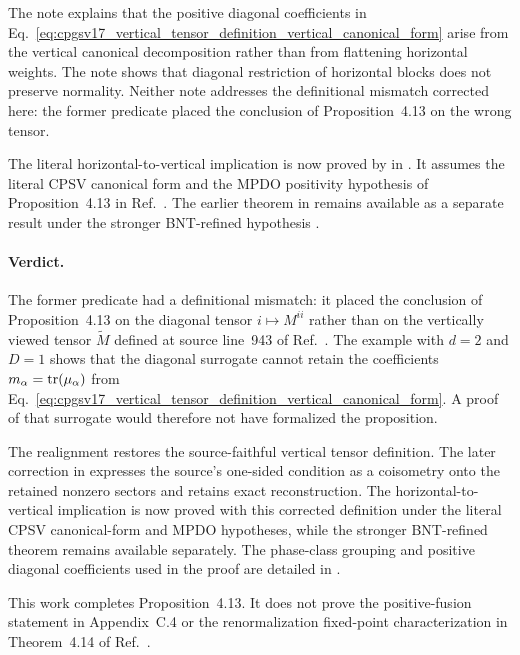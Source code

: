 \documentclass{article}
\begin{document}
The note  explains that the positive
diagonal coefficients in
Eq.~\ref{eq:cpgsv17_vertical_tensor_definition_vertical_canonical_form} arise
from the vertical canonical decomposition rather than from flattening
horizontal weights. The note
 shows that diagonal
restriction of horizontal blocks does not preserve normality. Neither note
addresses the definitional mismatch corrected here: the former predicate
placed the conclusion of Proposition~4.13 on the wrong tensor.

The literal horizontal-to-vertical implication is now proved by
 in
. It assumes the literal
CPSV canonical form and the MPDO positivity hypothesis of Proposition~4.13 in
Ref.~\cite{Cirac2016MPDO_arXiv}. The earlier theorem
 in
 remains available as a
separate result under the stronger BNT-refined hypothesis
.

\paragraph{Verdict.}
The former predicate had a definitional mismatch: it placed the conclusion of
Proposition~4.13 on the diagonal tensor $i\mapsto M^{ii}$ rather than on the
vertically viewed tensor $\widetilde M$ defined at source line~943 of
Ref.~\cite{Cirac2016MPDO_arXiv}. The example with $d=2$ and $D=1$ shows that
the diagonal surrogate cannot retain the coefficients
$m_\alpha=\operatorname{tr}(\mu_\alpha)$ from
Eq.~\ref{eq:cpgsv17_vertical_tensor_definition_vertical_canonical_form}.
A proof of that surrogate would therefore not have formalized the proposition.

The realignment restores the source-faithful vertical tensor definition. The
later correction in
 expresses the source's
one-sided condition as a coisometry onto the retained nonzero sectors and
retains exact reconstruction. The horizontal-to-vertical implication is now
proved with this corrected definition under the literal CPSV canonical-form
and MPDO hypotheses, while the stronger BNT-refined theorem remains
available separately. The phase-class grouping and positive diagonal
coefficients used in the proof are detailed in
.

This work completes Proposition~4.13. It does not prove the positive-fusion
statement in Appendix~C.4 or the renormalization fixed-point characterization
in Theorem~4.14 of Ref.~\cite{Cirac2016MPDO_arXiv}.



\end{document}
